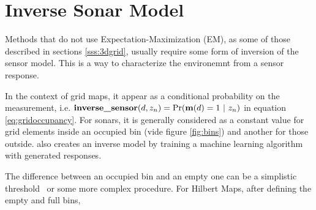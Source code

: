 \section{Inverse Sonar Model}

Methods that do not use Expectation-Maximization (EM), as some of those
described in sections \ref{sss:3dgrid}, usually require some form of inversion
of the sensor model. This is a way to characterize the environemnt from a sensor
response.

In the context of grid maps, it appear as a conditional probability on the
measurement, i.e.
$\text{\textbf{inverse\_sensor}}(d,z_n)=\Pr(\mathrm{\mathbf{m}}(d)=1~|~z_n)$ in equation
\ref{eq:gridoccupancy}. For sonars, it is generally considered as a constant
value for grid elements inside an occupied bin (vide figure \ref{fig:bins}) and
another for those outside\cite{thrunprob}. \citet{thrunprob} also creates an
inverse model by training a machine learning algorithm with generated responses.

The difference between an occupied bin and an empty one can be a simplistic
threshold~\cite{ribas2010underwater,Moravec1985,thrunprob} or some more complex
procedure. For Hilbert Maps, after defining the empty and full bins, 